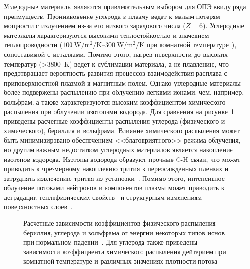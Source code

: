 Углеродные материалы являются привлекательным выбором для ОПЭ ввиду ряда преимуществ. Проникновение углерода в плазму ведет к малым потерям мощности с излучением из-за его низкого зарядового числа ($Z=6$). Углеродные материалы характеризуются высокими теплостойкостью и значением теплопроводности ($\SIrange{100}{300}{\watt\per\meter\squared\per\kelvin}$ при комнатной температуре~\cite{Merola2004, Begrambekov2023}), сопоставимой с металлами. Помимо этого, нагрев поверхности до высоких температур (>\SI{3800}{\kelvin}) ведет к сублимации материала, а не плавлению, что предотвращает вероятность развития процессов взаимодействия расплава с приповерхностной плазмой и магнитным полем. Однако углеродные материалы более подвержены распылению при облучению легкими ионами, чем, например, вольфрам. а также характеризуются высоким коэффициентом химического распыления при облучении изотопами водорода. Для сравнения на рисунке~\cref{fig:ch1/sputerring_yields} приведены расчетные коэффициенты распыления углерода (физического и химического), бериллия и вольфрама. Влияние химического распыления может быть минимизировано обеспечением <<благоприятного>> режима облучения, но другим важным недостатком углеродных материалов является накопление изотопов водорода. Изотопы водорода образуют прочные C-H связи, что может приводить к чрезмерному накоплению трития в переосажденных пленках и затруднять извлечению трития из установки~\cite{Gasparyan2024}. Помимо этого, интенсивное облучение потоками нейтронов и компонентов плазмы может приводить к деградации теплофизических свойств~\cite{Wu1994} и структурным изменениям поверхностных слоев~\cite{Wang2018,Begrambekov2019,Seyedhabashi2025}.

\begin{figure}[ht]
    \caption{Расчетные зависимости коэффициентов физического распыления бериллия, углерода и вольфрама от энергии некоторых типов ионов при нормальном падении~\cite{international2001iaea, behrisch_2025}. Для углерода также приведены зависимости коэффициента химического распыления дейтерием при комнатной температуре и различных значениях плотности потока~\cite{Roth1999,Roth2004}}\label{fig:ch1/sputerring_yields}
\end{figure}


